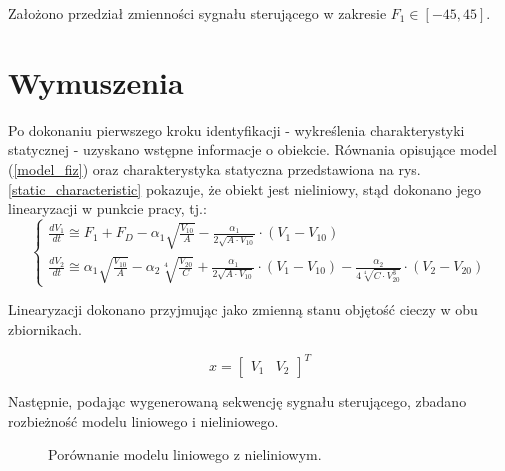 \noindent Założono przedział zmienności sygnału sterującego w zakresie $F_1 \in [-45, 45]$.

\newpage

\section{Wymuszenia}
Po dokonaniu pierwszego kroku identyfikacji - wykreślenia charakterystyki statycznej - uzyskano wstępne informacje o obiekcie. Równania opisujące model (\ref{model_fiz}) oraz charakterystyka statyczna przedstawiona na rys. \ref{static_characteristic} pokazuje, że obiekt jest nieliniowy, stąd dokonano jego linearyzacji w punkcie pracy, tj.:
\begin{equation}
\begin{cases}
\frac{dV_1}{dt} \cong F_1 + F_D - \alpha_1 \sqrt{\frac{V_{10}}{A}} - \frac{\alpha_1}{2 \sqrt{A \cdot V_{10}}} \cdot (V_1 - V_{10})\\
\frac{dV_2}{dt} \cong \alpha_1 \sqrt{\frac{V_{10}}{A}} - \alpha_2 \sqrt[4]{\frac{V_{20}}{C}} + \frac{\alpha_1}{2 \sqrt{A \cdot V_{10}}} \cdot (V_1 - V_{10}) - \frac{\alpha_2}{4 \sqrt[4]{C \cdot V_{20}^3}} \cdot (V_2 - V_{20})
\end{cases}
\end{equation}

\noindent Linearyzacji dokonano przyjmując jako zmienną stanu objętość cieczy w obu zbiornikach. 

\begin{equation}
x = \begin{bmatrix} V_1 & V_2 \end{bmatrix}^T
\end{equation}

Następnie, podając wygenerowaną sekwencję sygnału sterującego, zbadano rozbieżność modelu liniowego i nieliniowego.

\begin{figure}[h!]
\centering
{}
\hfill
{}
\caption{Porównanie modelu liniowego z nieliniowym.}
\end{figure}


